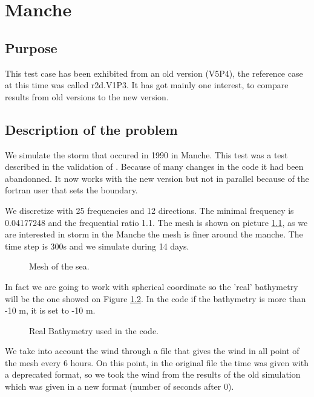 \chapter{Manche}
%
%
\section{Purpose}
%
This test case has been exhibited from an old version (V5P4), the reference
case at this time was called r2d.V1P3. It has got mainly one interest, to
compare results from old versions to the new version.  

%
\section{Description of the problem}
We simulate the storm that occured in 1990 in Manche. This test was a test
described in the validation of  \cite{Benoit1996_3}. Because of many
changes in the code it had been abandonned. It now works with the new version
but not in parallel because of the fortran user that sets the boundary. 

We discretize with 25 frequencies and 12 directions. The minimal frequency is
0.04177248 and the frequential ratio 1.1. The mesh is shown on picture
\ref{figmanchemesh}, as we are interested in storm in the Manche the mesh is
finer around the manche. 
The time step is 300s and we simulate during 14 days. 
\begin{figure} [!h]
\centering
{}
 \caption{Mesh of the sea.}
\label{figmanchemesh}
\end{figure}

In fact we are going to work with spherical coordinate so the 'real' bathymetry
will be the one showed on Figure \ref{realbathymanche}. In the code if the
bathymetry is more than -10 m, it is set to -10 m.
\begin{figure} [!h]
\centering
{}
 \caption{Real Bathymetry used in the code.}
\label{realbathymanche}
\end{figure}

We take into account the wind through a file that gives the wind in all point
of the mesh every 6 hours. On this point, in the original file the time was
given with a deprecated format, so we took the wind from the results of the
old simulation which was given in a new format (number of seconds after 0).

